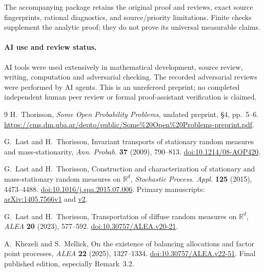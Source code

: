 \documentclass[11pt]{article}
\newcommand{\R}{\mathbb R}
\begin{document}
The accompanying package retains the original proof and reviews, exact source fingerprints, rational diagnostics, and source/priority limitations. Finite checks supplement the analytic proof; they do not prove its universal measurable claims.

\paragraph{AI use and review status.}
AI tools were used extensively in mathematical development, source review, writing, computation and adversarial checking. The recorded adversarial reviews were performed by AI agents. This is an unrefereed preprint; no completed independent human peer review or formal proof-assistant verification is claimed.

\begin{thebibliography}{9}
H.~Thorisson, \emph{Some Open Probability Problems}, undated preprint, \S4, pp.~5--6.
\url{https://cms.dm.uba.ar/depto/public/Some%20Open%20Problems-preprint.pdf}.

G.~Last and H.~Thorisson, Invariant transports of stationary random measures and mass-stationarity, \emph{Ann. Probab.} \textbf{37} (2009), 790--813.
\href{https://doi.org/10.1214/08-AOP420}{doi:10.1214/08-AOP420}.

G.~Last and H.~Thorisson, Construction and characterization of stationary and mass-stationary random measures on $\R^d$, \emph{Stochastic Process. Appl.} \textbf{125} (2015), 4473--4488.
\href{https://doi.org/10.1016/j.spa.2015.07.006}{doi:10.1016/j.spa.2015.07.006}.
Primary manuscripts: \href{https://arxiv.org/abs/1405.7566v1}{arXiv:1405.7566v1} and \href{https://arxiv.org/abs/1405.7566v2}{v2}.

G.~Last and H.~Thorisson, Transportation of diffuse random measures on $\R^d$, \emph{ALEA} \textbf{20} (2023), 577--592.
\href{https://doi.org/10.30757/ALEA.v20-21}{doi:10.30757/ALEA.v20-21}.

A.~Khezeli and S.~Mellick, On the existence of balancing allocations and factor point processes, \emph{ALEA} \textbf{22} (2025), 1327--1334.
\href{https://doi.org/10.30757/ALEA.v22-51}{doi:10.30757/ALEA.v22-51}. Final published edition, especially Remark~3.2.
\end{thebibliography}
\end{document}
